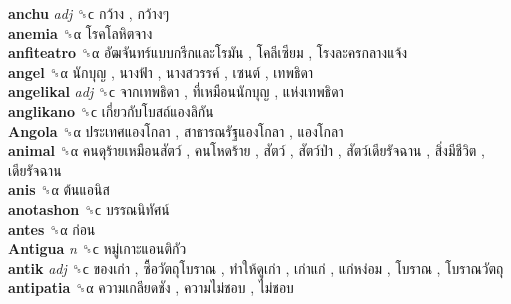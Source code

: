 \textbf{anchu} \emph{adj}  ␝ϲ   กว้าง ,  กว้างๆ   \\
\textbf{anemia} ␝α   โรคโลหิตจาง   \\
\textbf{anfiteatro} ␝α   อัฒจันทร์แบบกรีกและโรมัน ,  โคลีเซียม ,  โรงละครกลางแจ้ง   \\
\textbf{angel} ␝α   นักบุญ ,  นางฟ้า ,  นางสวรรค์ ,  เซนต์ ,  เทพธิดา   \\
\textbf{angelikal} \emph{adj}  ␝ϲ   จากเทพธิดา ,  ที่เหมือนนักบุญ ,  แห่งเทพธิดา   \\
\textbf{anglikano} ␝ϲ   เกี่ยวกับโบสถ์แองลิกัน   \\
\textbf{Angola} ␝α   ประเทศแองโกลา ,  สาธารณรัฐแองโกลา ,  แองโกลา   \\
\textbf{animal} ␝α   คนดุร้ายเหมือนสัตว์ ,  คนโหดร้าย ,  สัตว์ ,  สัตว์ป่า ,  สัตว์เดียรัจฉาน ,  สิ่งมีชีวิต ,  เดียรัจฉาน   \\
\textbf{anis} ␝α   ต้นแอนิส   \\
\textbf{anotashon} ␝ϲ   บรรณนิทัศน์   \\
\textbf{antes} ␝α   ก่อน   \\
\textbf{Antigua} \emph{n}  ␝ϲ   หมู่เกาะแอนติกัว   \\
\textbf{antik} \emph{adj}  ␝ϲ   ของเก่า ,  ซื้อวัตถุโบราณ ,  ทำให้ดูเก่า ,  เก่าแก่ ,  แก่หง่อม ,  โบราณ ,  โบราณวัตถุ   \\
\textbf{antipatia} ␝α   ความเกลียดชัง ,  ความไม่ชอบ ,  ไม่ชอบ   \\
